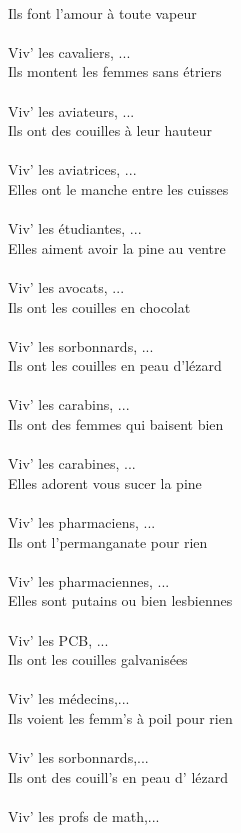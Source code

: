 \\Ils font l'amour à toute vapeur
\\\\Viv' les cavaliers, ...
\\Ils montent les femmes sans étriers
\\\\Viv' les aviateurs, ...
\\Ils ont des couilles à leur hauteur
\\\\Viv' les aviatrices, ...
\\Elles ont le manche entre les cuisses
\\\\Viv' les étudiantes, ...
\\Elles aiment avoir la pine au ventre
\\\\Viv' les avocats, ...
\\Ils ont les couilles en chocolat
\\\\Viv' les sorbonnards, ...
\\Ils ont les couilles en peau d'lézard
\\\\Viv' les carabins, ...
\\Ils ont des femmes qui baisent bien
\\\\Viv' les carabines, ...
\\Elles adorent vous sucer la pine
\\\\Viv' les pharmaciens, ...
\\Ils ont l'permanganate pour rien
\\\\Viv' les pharmaciennes, ...
\\Elles sont putains ou bien lesbiennes
\\\\Viv' les PCB, ...
\\Ils ont les couilles galvanisées
\\\\Viv' les médecins,...
\\Ils voient les femm's à poil pour rien
\\\\Viv' les sorbonnards,...
\\Ils ont des couill's en peau d' lézard
\\\\Viv' les profs de math,...
